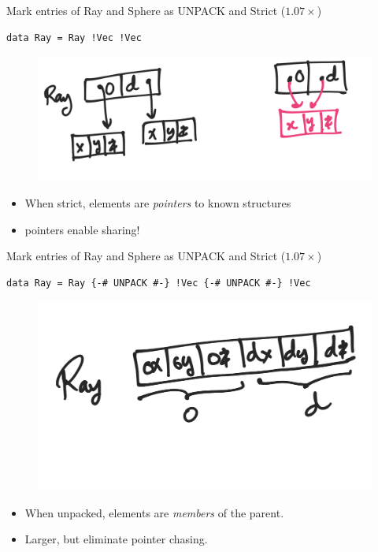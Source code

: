 \documentclass[8pt]{beamer}
\begin{document}
\begin{frame}[fragile]{Mark entries of Ray and Sphere as UNPACK and Strict ($1.07\times$)}
\begin{verbatim}
data Ray = Ray !Vec !Vec
\end{verbatim}

\begin{figure}
\includegraphics[height=0.4\textheight]{./ray-strict.png}
\end{figure}

\begin{itemize}
\item When strict, elements are \emph{pointers} to known structures
\item pointers enable sharing!
\end{itemize}

\end{frame}

\begin{frame}[fragile]{Mark entries of Ray and Sphere as UNPACK and Strict ($1.07\times$)}
\begin{verbatim}
data Ray = Ray {-# UNPACK #-} !Vec {-# UNPACK #-} !Vec 
\end{verbatim}

\begin{figure}
\includegraphics[height=0.4\textheight]{./ray-unpack.png}
\end{figure}

\begin{itemize}
\item When unpacked, elements are \emph{members} of the parent.
\item Larger, but eliminate pointer chasing.
\end{itemize}
\end{frame}
\end{document}
